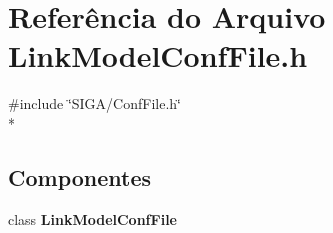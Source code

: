 \section{Referência do Arquivo Link\+Model\+Conf\+File.\+h}
\label{_link_model_conf_file_8h}
{\ttfamily \#include \char`\"{}S\+I\+G\+A/\+Conf\+File.\+h\char`\"{}}\\*
\subsection*{Componentes}
\begin{DoxyCompactItemize}
\item 
class {\bf Link\+Model\+Conf\+File}
\end{DoxyCompactItemize}
